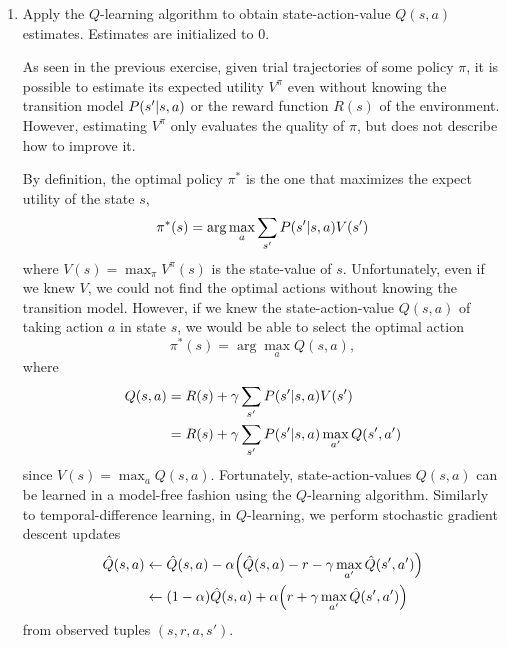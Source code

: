 \documentclass[11pt, a4paper]{article}
\begin{document}
\begin{enumerate}
    \item Apply the $Q$-learning algorithm to obtain state-action-value $Q(s, a)$ estimates. Estimates are initialized to $0$.

    \begin{solution}
        As seen in the previous exercise, given trial trajectories of some policy $\pi$, it is possible to estimate its expected utility $V^\pi$ even without knowing the transition model $P(s' \vert s, a)$ or the reward function $R(s)$ of the environment. However, estimating $V^\pi$ only evaluates the quality of $\pi$, but does not describe how to improve it.

        By definition, the optimal policy $\pi^*$ is the one that maximizes the expect utility of the state $s$, \ie{}
        \begin{equation*}
            \pi^*(s) = \arg \max_a \sum_{s'} P(s' \vert s, a) V(s')
        \end{equation*}
        where $V(s) = \max_\pi V^\pi(s)$ is the state-value of $s$. Unfortunately, even if we knew $V$, we could not find the optimal actions without knowing the transition model. However, if we knew the state-action-value $Q(s, a)$ of taking action $a$ in state $s$, we would be able to select the optimal action
        \begin{equation*}
            \pi^*(s) = \arg \max_a Q(s, a) ,
        \end{equation*}
        where
        \begin{align*}
            Q(s, a) & = R(s) + \gamma \sum_{s'} P(s' \vert s, a) V(s') \\
            & = R(s) + \gamma \sum_{s'} P(s' \vert s, a) \max_{a'} Q(s', a')
        \end{align*}
        since $V(s) = \max_a Q(s, a)$. Fortunately, state-action-values $Q(s, a)$ can be learned in a model-free fashion using the $Q$-learning algorithm. Similarly to temporal-difference learning, in $Q$-learning, we perform stochastic gradient descent updates
        \begin{align*}
            \hat{Q}(s, a) & \gets \hat{Q}(s, a) - \alpha \rbk*{\hat{Q}(s, a) - r - \gamma \max_{a'} \hat{Q}(s', a')} \\
            & \gets (1 - \alpha) \hat{Q}(s, a) + \alpha \rbk*{r + \gamma \max_{a'} \hat{Q}(s', a')}
        \end{align*}
        from observed tuples $(s, r, a, s')$.


\end{solution}
\end{enumerate}
\end{document}
